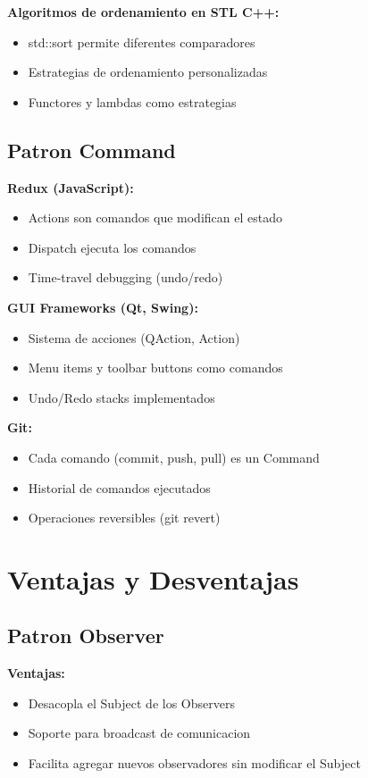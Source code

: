 \documentclass[11pt,a4paper]{article}
\begin{document}
\textbf{Algoritmos de ordenamiento en STL C++:}
\begin{itemize}
    \item std::sort permite diferentes comparadores
    \item Estrategias de ordenamiento personalizadas
    \item Functores y lambdas como estrategias
\end{itemize}

\subsection{Patron Command}

\textbf{Redux (JavaScript):}
\begin{itemize}
    \item Actions son comandos que modifican el estado
    \item Dispatch ejecuta los comandos
    \item Time-travel debugging (undo/redo)
\end{itemize}

\textbf{GUI Frameworks (Qt, Swing):}
\begin{itemize}
    \item Sistema de acciones (QAction, Action)
    \item Menu items y toolbar buttons como comandos
    \item Undo/Redo stacks implementados
\end{itemize}

\textbf{Git:}
\begin{itemize}
    \item Cada comando (commit, push, pull) es un Command
    \item Historial de comandos ejecutados
    \item Operaciones reversibles (git revert)
\end{itemize}

\section{Ventajas y Desventajas}

\subsection{Patron Observer}

\textbf{Ventajas:}
\begin{itemize}
    \item Desacopla el Subject de los Observers
    \item Soporte para broadcast de comunicacion
    \item Facilita agregar nuevos observadores sin modificar el Subject
\end{itemize}
\end{document}
